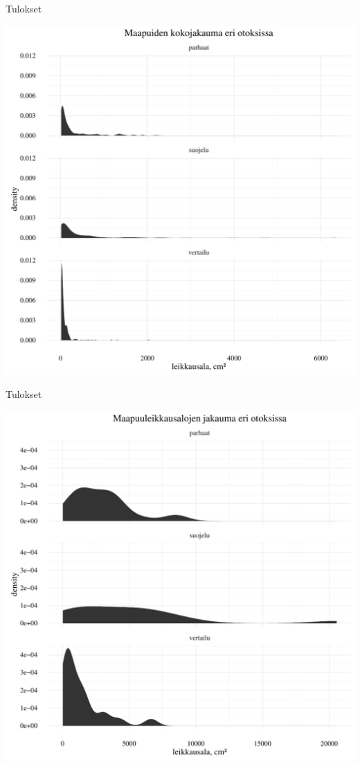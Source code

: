 \documentclass{beamer}
\begin{document}
\begin{frame}{Tulokset}
  \begin{center}
    \includegraphics[height = 0.9\textheight]{maapuiden_koko.pdf}
  \end{center}
\end{frame}

\begin{frame}{Tulokset}
  \begin{center}
    \includegraphics[height = 0.9\textheight]{maapuiden_leikkasalat.pdf}
  \end{center}
\end{frame}
\end{document}
